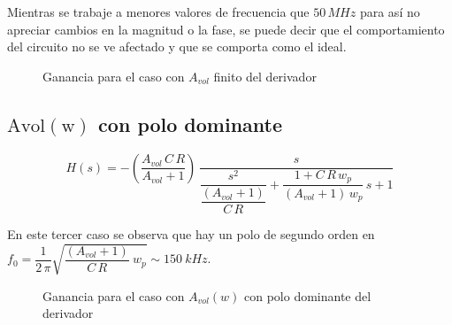 Mientras se trabaje a menores valores de frecuencia que $50 \, MHz$ para así no apreciar cambios en la magnitud o la fase, se puede decir que el comportamiento del circuito no se ve afectado y que se comporta como el ideal. 

\begin{figure}[H]
	\begin{center}
		\caption{Ganancia para el caso con $A_{vol}$ finito del derivador}
		\label{avolfinitoderivador}
	\end{center}
\end{figure}

\subsection{$\mathrm{A{vol}(w)}$ con polo dominante}

\begin{equation}
H(s) = - \left( \dfrac{A_{vol} \,C \,R}{A_{vol} + 1} \right) \, \dfrac{s}{ \dfrac{s^2}{\dfrac{(A_{vol}+1)}{C \,R}} + \dfrac{1+ C \,R \,w_p}{(A_{vol} + 1) \,w_p} \,s + 1} 
\end{equation}

En este tercer caso se observa que hay un polo de segundo orden en $f_0 = \dfrac{1}{2 \,\pi} \sqrt{\dfrac{(A_{vol}+1)}{C \,R} \ w_p} \sim 150 \ kHz$.

\begin{figure}[H]
	\begin{center}
		\caption{Ganancia para el caso con $A_{vol}(w)$ con polo dominante del derivador}
		\label{avolpolodominantederivador}
	\end{center}
\end{figure}

